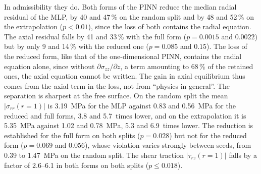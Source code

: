 \documentclass[subscriptcorrection,upint,varvw,barcolor=Goldenrod3,mathalfa=cal=euler,balance,hyphenate,french,pdf-a]{asmejour} %
\begin{document}
In admissibility they do. Both forms of the PINN reduce the median radial residual of the MLP, by 40 and 47\,\% on the random split and by 48 and 52\,\% on the extrapolation ($p<0.01$), since the loss of both contains the radial equation. The axial residual falls by 41 and 33\,\% with the full form ($p=0.0015$ and $0.0022$) but by only 9 and 14\,\% with the reduced one ($p=0.085$ and $0.15$). The loss of the reduced form, like that of the one-dimensional PINN, contains the radial equation alone, since without $\partial\sigma_{zz}/\partial z$, a term amounting to 68\,\% of the retained ones, the axial equation cannot be written. The gain in axial equilibrium thus comes from the axial term in the loss, not from ``physics in general''. The separation is sharpest at the free surface. On the random split the mean $|\sigma_{rr}(r{=}1)|$ is 3.19~MPa for the MLP against 0.83 and 0.56~MPa for the reduced and full forms, 3.8 and 5.7~times lower, and on the extrapolation it is 5.35~MPa against 1.02 and 0.78~MPa, 5.3 and 6.9~times lower. The reduction is established for the full form on both splits ($p=0.028$) but not for the reduced form ($p=0.069$ and $0.056$), whose violation varies strongly between seeds, from 0.39 to 1.47~MPa on the random split. The shear traction $|\tau_{rz}(r{=}1)|$ falls by a factor of 2.6--6.1 in both forms on both splits ($p\le0.018$).
\end{document}
